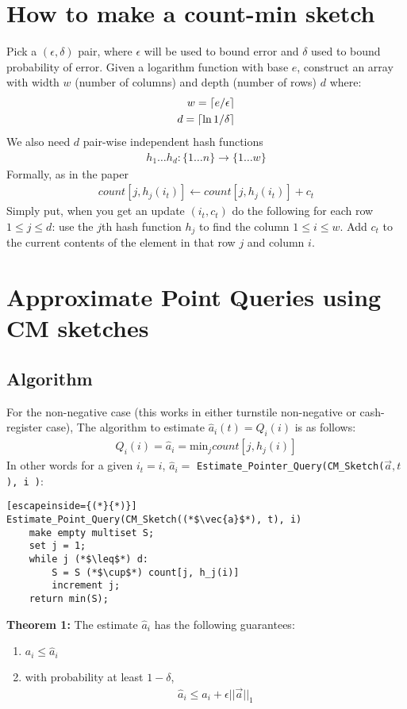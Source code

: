 \documentclass[11pt]{article}
\newcommand{\sq}{\mathit{Q}_i}
\DeclarePairedDelimiter\ceil{\lceil}{\rceil}
\newcommand{\ra}{\rightarrow}
\begin{document}
\section{How to make a count-min sketch}
Pick a $(\epsilon, \delta)$ pair, where $\epsilon$ will be used to bound error 
and $\delta$ used to bound probability of error.  Given a logarithm function
with base $e$, construct an array with width $w$ (number of columns) and 
depth (number of rows) $d$ where:
\begin{align}
    w = \ceil{e/\epsilon}\\
    d = \ceil{\ln{1/\delta}}
\end{align}
We also need $d$ pair-wise independent hash functions
\begin{align}
    h_1 \dots h_d : \{1 \dots n\} \ra \{1 \dots w\} 
\end{align}
Formally, as in the paper
\begin{align}
    count[j, h_j(i_t)] \leftarrow count[j, h_j(i_t)] + c_t     
\end{align}
Simply put, when you get an update $(i_t, c_t)$ do the following for each row $1 \leq j \leq d$:
use the $j$th hash function $h_j$ to find the column $1 \leq i \leq w$. Add $c_t$ to the current
contents of the element in that row $j$ and column $i$. 

\section{Approximate Point Queries using CM sketches}
\subsection{Algorithm}
For the non-negative case (this works in either turnstile non-negative or cash-register case),
The algorithm to estimate $\hat{a}_i(t) = \sq(i)$ is as follows: \begin{align}
    \sq(i) = \hat{a}_i = \text{min}_j count[j, h_j(i)]
\end{align}
In other words for a given $i_t = i$, $\hat a_i =$ \texttt{Estimate\_Pointer\_Query(CM\_Sketch($\vec{a}, t$), i )}:
\begin{lstlisting}[escapeinside={(*}{*)}]
Estimate_Point_Query(CM_Sketch((*$\vec{a}$*), t), i) 
    make empty multiset S;
    set j = 1;
    while j (*$\leq$*) d:
        S = S (*$\cup$*) count[j, h_j(i)]
        increment j;
    return min(S);
\end{lstlisting}

\textbf{Theorem 1:} The estimate $\hat a_i$ has the following guarantees:
\begin{enumerate}[label=\textnormal{(\arabic*)}]
    \item $a_i \leq \hat{a}_i$
    \item with probability at least $1 - \delta$, 
    \begin{align}
        \hat{a}_i \leq a_i + \epsilon ||\vec{a}||_1 
    \end{align}
\end{enumerate}
\end{document}
